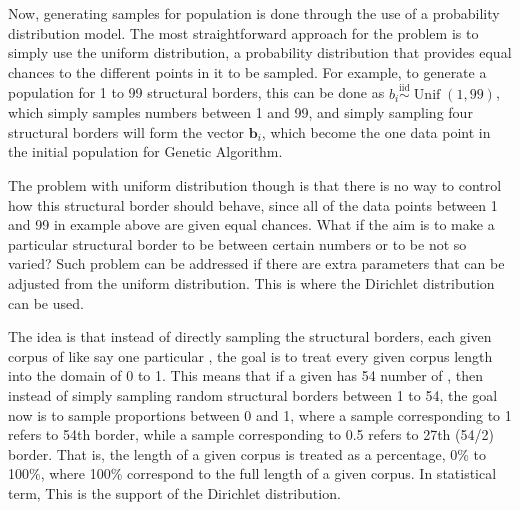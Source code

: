 Now, generating samples for population is done through the use of a probability distribution model. The most straightforward approach for the problem is to simply use the uniform distribution, a probability distribution that provides equal chances to the different points in it to be sampled. For example, to generate a population for 1 to 99 structural borders, this can be done as $b_i\overset{\text{iid}}{\sim}\operatorname{Unif}(1,99)$, which simply samples numbers between 1 and 99, and simply sampling four structural borders will form the vector $\mathbf{b}_i$, which become the one data point in the initial population for Genetic Algorithm.

The problem with uniform distribution though is that there is no way to control how this structural border should behave, since all of the data points between 1 and 99 in example above are given equal chances. What if the aim is to make a particular structural border to be between certain numbers or to be not so varied? Such problem can be addressed if there are extra parameters that can be adjusted from the uniform distribution. This is where the Dirichlet distribution can be used.

The idea is that instead of directly sampling the structural borders, each given corpus of   like say one particular  , the goal is to treat every given corpus length into the domain of 0 to 1. This means that if a given   has 54 number of  , then instead of simply sampling random structural borders between 1 to 54, the goal now is to sample proportions between 0 and 1, where a sample corresponding to 1 refers to 54th border, while a sample corresponding to 0.5 refers to 27th (54/2) border. That is, the length of a given corpus is treated as a percentage, 0\% to 100\%, where 100\% correspond to the full length of a given corpus. In statistical term,  This is the support of the Dirichlet distribution.

